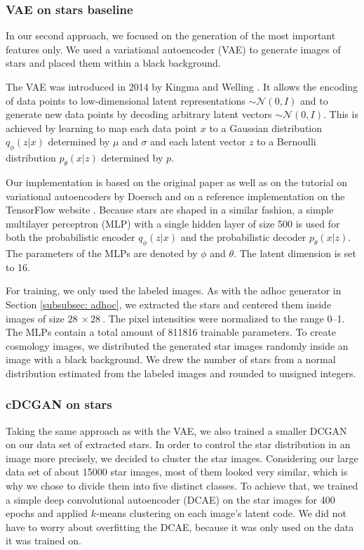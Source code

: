 \documentclass[10pt,conference,compsocconf]{IEEEtran}
\begin{document}
\subsubsection{VAE on stars baseline} %
In our second approach, we focused on the generation of the most important features only. We used a variational autoencoder (VAE) to generate images of stars and placed them within a black background. 

The VAE was introduced in 2014 by Kingma and Welling \cite{DBLP:journals/corr/KingmaW13}. It allows the encoding of data points to low-dimensional latent representations  $\sim\mathcal{N}(0, I)$ and to generate new data points by decoding arbitrary latent vectors $\sim\mathcal{N}(0, I)$. This is achieved by learning to map each data point $x$ to a Gaussian distribution $q_{\phi}(z|x)$ determined by $\mu$ and $\sigma$ and each latent vector $z$ to a Bernoulli distribution $p_{\theta}(x|z)$ determined by $p$.
 
Our implementation is based on the original paper as well as on the tutorial on variational autoencoders by Doersch \cite{doersch2016tutorial} and on a reference implementation on the TensorFlow website \cite{cvaetf}. Because stars are shaped in a similar fashion, a simple multilayer perceptron (MLP) with a single hidden layer of size \SI{500}{} is used for both the probabilistic encoder $q_{\phi}(z|x)$ and the probabilistic decoder $p_{\theta}(x|z)$. The parameters of the MLPs are denoted by $\phi$ and $\theta$. The latent dimension is set to \SI{16}{}. 

For training, we only used the labeled images. As with the adhoc generator in Section \ref{subsubsec: adhoc}, we extracted the stars and centered them inside images of size $\SI{28}{}\times\SI{28}{}$. The pixel intensities were normalized to the range \SIrange{0}{1}{}. The MLPs contain a total amount of \SI{811816}{} trainable parameters. To create cosmology images, we distributed the generated star images randomly inside an image with a black background.
We drew the number of stars from a normal distribution estimated from the labeled images and rounded to unsigned integers.

\subsubsection{cDCGAN on stars}
Taking the same approach as with the VAE, we also trained a smaller DCGAN on our data set of extracted stars.
In order to control the star distribution in an image more precisely, we decided to cluster the star images. Considering our large data set of about \SI{15000}{} star images, most of them looked very similar, which is why we chose to divide them into five distinct classes. To achieve that, we trained a simple deep convolutional autoencoder (DCAE) on the star images for 400 epochs and applied $k$-means clustering on each image's latent code. We did not have to worry about overfitting the DCAE, because it was only used on the data it was trained on.
\end{document}
